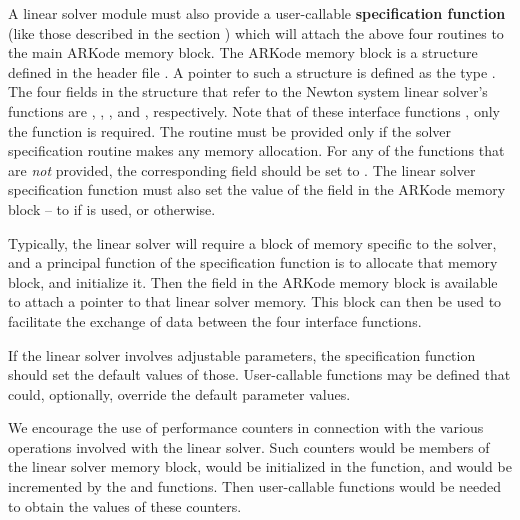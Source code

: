 \documentclass[letterpaper,10pt,english]{sphinxmanual}
\begin{document}
A linear solver module must also provide a user-callable \textbf{specification
function} (like those described in the section
{\hyperref[c_interface/User_callable:cinterface-linearsolvers]{\emph{}}}) which will attach the above four
routines to the main ARKode memory block. The ARKode memory block is a
structure defined in the header file . A pointer to
such a structure is defined as the type . The four
fields in the  structure that refer to the Newton system
linear solver's functions are , ,
, and , respectively.  Note that of these
interface functions , only the {\hyperref[linear_solvers/custom:c.lsolve]{\emph{}}} function is
required. The {\hyperref[linear_solvers/custom:c.lfree]{\emph{}}} routine must be provided only if the
solver specification routine makes any memory allocation.  For any of
the functions that are \emph{not} provided, the corresponding field should
be set to . The linear
solver specification function must also set the value of the field
 in the ARKode memory block -- to  if
{\hyperref[linear_solvers/custom:c.lsetup]{\emph{}}} is used, or  otherwise.

Typically, the linear solver will require a block of memory specific
to the solver, and a principal function of the specification function
is to allocate that memory block, and initialize it.  Then the field
 in the ARKode memory block  is available to
attach a pointer to that linear solver memory.  This block can then be
used to facilitate the exchange of data between the four interface
functions.

If the linear solver involves adjustable parameters, the specification
function should set the default values of those.  User-callable
functions may be defined that could, optionally, override the default
parameter values.

We encourage the use of performance counters in connection with the various
operations involved with the linear solver.  Such counters would be
members of the linear solver memory block, would be initialized in the
{\hyperref[linear_solvers/custom:c.linit]{\emph{}}} function, and would be incremented by the
{\hyperref[linear_solvers/custom:c.lsetup]{\emph{}}} and {\hyperref[linear_solvers/custom:c.lsolve]{\emph{}}} functions.  Then
user-callable functions would be needed to obtain the values of these
counters.
\end{document}
